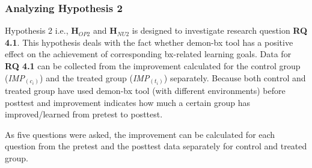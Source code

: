 \subsubsection{Analyzing Hypothesis 2}\label{subsubsec:hypothesis2}
Hypothesis 2 i.e., \textbf{H$_{OP2}$} and \textbf{H$_{NU2}$} is designed to investigate research question \textbf{RQ 4.1}. This hypothesis deals with the fact whether demon-bx tool has a positive effect on the achievement of corresponding bx-related learning goals. Data for \textbf{RQ 4.1} can be collected from the improvement calculated for the control group (\textit{IMP$_{(c_i)}$}) and the treated group (\textit{IMP$_{(t_i)}$}) separately. Because both control and treated group have used demon-bx tool (with different environments) before posttest and improvement indicates how much a certain group has improved/learned from pretest to posttest. 

As five questions were asked, the improvement can be calculated for each question from the pretest and the posttest data separately for control and treated group. 


